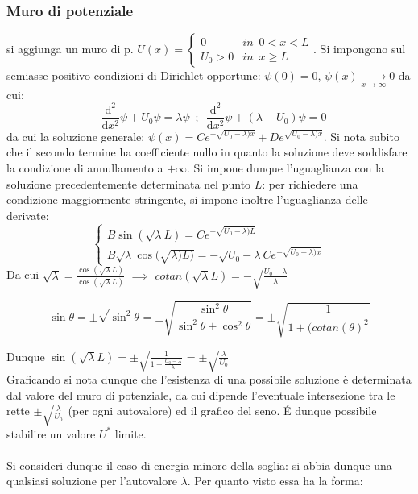 \documentclass[10pt, oneside]{book}
\theoremstyle{plain}
\begin{document}
\subsubsection{Muro di potenziale} si aggiunga un muro di p. $\displaystyle U(x) = \begin{cases}
    0 & in \enspace 0<x<L\\ U_0 > 0 & in \enspace x \geq L
\end{cases}$. Si impongono sul semiasse positivo condizioni di Dirichlet opportune: $\psi(0) = 0$, $\psi(x) \xrightarrow[x \rightarrow \infty]{} 0$ da cui: 
\[- \frac{\textrm{d}^2}{\textrm{d}x^2}\psi + U_0 \psi= \lambda \psi \enspace ; \enspace \frac{\textrm{d}^2}{\textrm{d}x^2}\psi + (\lambda - U_0) \psi = 0\]
da cui la soluzione generale: $\displaystyle \psi(x) = C e^{\displaystyle - \sqrt{U_0 - \lambda) x}} + D  e^{\displaystyle \sqrt{U_0 - \lambda) x}}$. Si nota subito che il secondo termine ha coefficiente nullo in quanto la soluzione deve soddisfare la condizione di annullamento a $+\infty$. Si impone dunque l'uguaglianza con la soluzione precedentemente determinata nel punto $L$: per richiedere una condizione maggiormente stringente, si impone inoltre l'uguaglianza delle derivate:
\[\begin{cases}
    B \sin(\sqrt{\lambda}L) = C  e^{\displaystyle - \sqrt{U_0 - \lambda) L}}\\
    B \sqrt{\lambda} \cos(\sqrt{\lambda) L)} = - \sqrt{U_0 - \lambda} C e^{\displaystyle - \sqrt{U_0 - \lambda) x}}
\end{cases}\]
Da cui $\displaystyle \sqrt{\lambda} = \frac{\cos(\sqrt{\lambda} L)}{\cos(\sqrt{\lambda} L)}$ $\implies$ $\displaystyle cotan(\sqrt{\lambda} L) = - \sqrt{\frac{U_0 - \lambda}{\lambda}}$
\begin{oss}[trigonometrica]
    \[\sin \theta = \pm \sqrt{\sin^2 \theta} = \pm \sqrt{\frac{\sin^2 \theta}{\sin^2 \theta + \cos^2 \theta}} = \pm \sqrt{\frac{1}{1 + (cotan (\theta)^2}}\]
\end{oss}
Dunque $\displaystyle \sin(\sqrt{\lambda} L) = \pm \sqrt{\frac{1}{\displaystyle 1 + \frac{U_0 - \lambda}{\lambda}}} = \pm \sqrt{\frac{\lambda}{U_0}}$
\\Graficando si nota dunque che l'esistenza di una possibile soluzione è determinata dal valore del muro di potenziale, da cui dipende l'eventuale intersezione tra le rette $\displaystyle \pm \sqrt{\frac{\lambda}{U_0}}$ (per ogni autovalore) ed il grafico del seno. \'E dunque possibile stabilire un valore $U^{\ast}$ limite.
\\~\\Si consideri dunque il caso di energia minore della soglia: si abbia dunque una qualsiasi soluzione per l'autovalore $\lambda$. Per quanto visto essa ha la forma:
\end{document}
